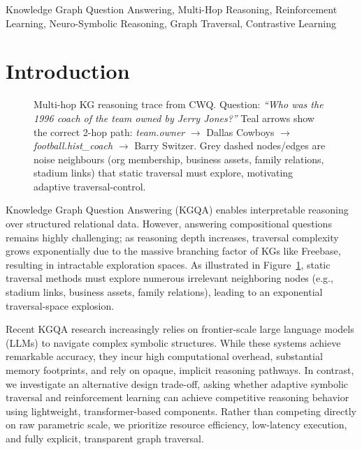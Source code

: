 \documentclass[10pt,conference]{IEEEtran}
\begin{document}

\begin{IEEEkeywords}
Knowledge Graph Question Answering,
Multi-Hop Reasoning,
Reinforcement Learning,
Neuro-Symbolic Reasoning,
Graph Traversal,
Contrastive Learning
\end{IEEEkeywords}


\section{Introduction}

\begin{figure}[t]
\centering

\caption{Multi-hop KG reasoning trace from CWQ. Question: \textit{``Who was the 1996 coach of the team owned by Jerry Jones?''} Teal arrows show the correct 2-hop path: \textit{team.owner} $\to$ Dallas Cowboys $\to$ \textit{football.hist\_coach} $\to$ Barry Switzer. Grey dashed nodes/edges are noise neighbours (org membership, business assets, family relations, stadium links) that static traversal must explore, motivating adaptive traversal-control.}
\label{fig:kg}
\end{figure}

Knowledge Graph Question Answering (KGQA) enables interpretable reasoning over structured relational data. However, answering compositional questions remains highly challenging; as reasoning depth increases, traversal complexity grows exponentially due to the massive branching factor of KGs like Freebase, resulting in intractable exploration spaces. As illustrated in Figure~\ref{fig:kg}, static traversal methods must explore numerous irrelevant neighboring nodes (e.g., stadium links, business assets, family relations), leading to an exponential traversal-space explosion.

Recent KGQA research increasingly relies on frontier-scale large language models (LLMs) to navigate complex symbolic structures. While these systems achieve remarkable accuracy, they incur high computational overhead, substantial memory footprints, and rely on opaque, implicit reasoning pathways. In contrast, we investigate an alternative design trade-off, asking whether adaptive symbolic traversal and reinforcement learning can achieve competitive reasoning behavior using lightweight, transformer-based components. Rather than competing directly on raw parametric scale, we prioritize resource efficiency, low-latency execution, and fully explicit, transparent graph traversal.
\end{document}
